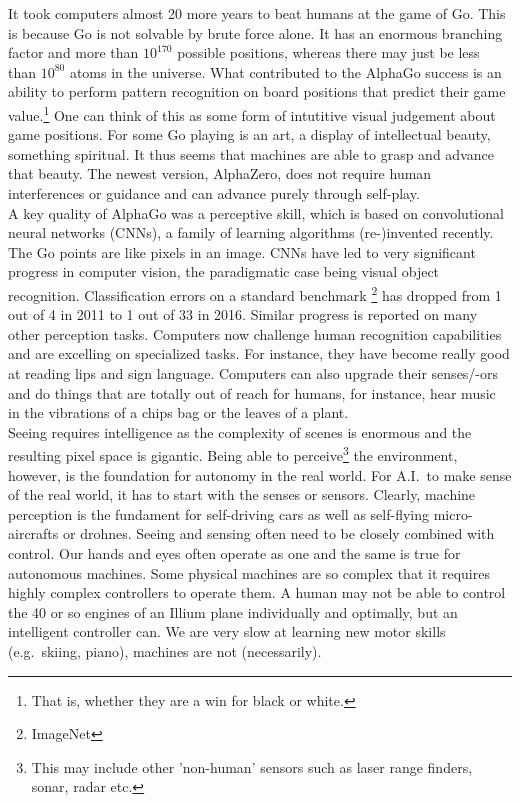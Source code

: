 \documentclass[a4]{article}
\begin{document}
\noindent It took computers almost 20 more years to beat humans at the game of Go. This is because Go is not solvable by brute force alone. It has an enormous branching factor and more than $10^{170}$ possible positions, whereas there may just be less than $10^{80}$ atoms in the universe. What contributed to the AlphaGo success is an ability to perform pattern recognition on board positions that predict their game value.\footnote{That is, whether they are a win for black or white.} One can think of this as some form of intutitive visual judgement about game positions. For some Go playing is an art, a display of intellectual beauty, something spiritual. It thus seems that machines are able to grasp and advance that beauty. The newest version, AlphaZero, does not require human interferences or guidance and can advance purely through self-play. \\

\noindent A key quality of AlphaGo was a perceptive skill, which is based on convolutional neural networks (CNNs), a family of learning algorithms (re-)invented recently. The Go points are like pixels in an image. CNNs have led to very significant progress in computer vision, the paradigmatic case being visual object recognition. Classification errors on a standard benchmark \footnote{ImageNet} has dropped from 1 out of 4 in 2011 to 1 out of 33 in 2016. Similar progress is reported on many other perception tasks. Computers now challenge human recognition capabilities and are excelling on specialized tasks. For instance, they have become really good at reading lips and sign language.  Computers can also upgrade their senses/-ors and do things that are totally out of reach for humans, for instance, hear music in the vibrations of a chips bag or the leaves of a plant.\\

\noindent Seeing requires intelligence as the complexity of scenes is enormous and the resulting pixel space is gigantic. Being able to perceive\footnote{This may include other 'non-human' sensors such as laser range finders, sonar, radar etc.} the environment, however, is the foundation for autonomy in the real world. For A.I.~to make sense of the real world, it has to start with the senses or sensors. Clearly, machine perception is the fundament for self-driving cars as well as self-flying micro-aircrafts or drohnes.  Seeing and sensing often need to be closely combined with control. Our hands and eyes often operate as one and the same is true for autonomous machines. Some physical machines are so complex that it requires highly complex controllers to operate them. A human may not be able to control the 40 or so engines of an Illium plane individually and optimally, but an intelligent controller can. We are very slow at learning new motor skills (e.g.~skiing, piano), machines are not (necessarily). \\
\end{document}
